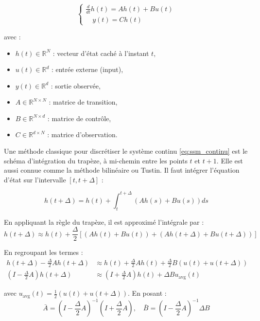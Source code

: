 \begin{equation}
\begin{cases}
\frac{d}{dt} h(t) = A h(t) + B u(t) \\
\quad y(t) = C h(t)
\end{cases}
\label{eq:ssm_continu}
\end{equation}

avec :
\begin{itemize}
    \item $h(t) \in \mathbb{R}^N$ : vecteur d'état caché à l'instant $t$,
    \item $u(t) \in \mathbb{R}^d$ : entrée externe (input),
    \item $y(t) \in \mathbb{R}^d$ : sortie observée,
    \item $A \in \mathbb{R}^{N \times N}$ : matrice de transition,
    \item $B \in \mathbb{R}^{N \times d}$ : matrice de contrôle,
    \item $C \in \mathbb{R}^{d \times N}$ : matrice d'observation.
\end{itemize}

Une méthode classique pour discrétiser le système continu \eqref{eq:ssm_continu} est le schéma d’intégration du trapèze, à mi-chemin entre les points $t$ et $t+1$. Elle est aussi connue comme la méthode bilinéaire ou Tustin. Il faut intégrer l’équation d’état sur l’intervalle $[t, t+\Delta]$ :

\begin{equation}
    h(t+\Delta) = h(t) + \int_t^{t+\Delta} \left( A h(s) + B u(s) \right) ds
\end{equation}

En appliquant la règle du trapèze, il est approximé l'intégrale par :
\begin{equation}
    h(t+\Delta) \approx h(t) + \frac{\Delta}{2} \left[ (A h(t) + B u(t)) + (A h(t+\Delta) + B u(t+\Delta)) \right]
\end{equation}

En regroupant les termes :
\begin{align*}
    h(t+\Delta) - \frac{\Delta}{2} A h(t+\Delta) &\approx h(t) + \frac{\Delta}{2} A h(t) + \frac{\Delta}{2} B \left( u(t) + u(t+\Delta) \right) \\
    \left( I - \frac{\Delta}{2} A \right) h(t+\Delta) &\approx \left( I + \frac{\Delta}{2} A \right) h(t) + \Delta B u_{\text{avg}}(t)
\end{align*}

avec $u_{\text{avg}}(t) = \frac{1}{2}(u(t) + u(t+\Delta))$. En posant :
\begin{equation}
\bar{A} = \left( I - \frac{\Delta}{2} A \right)^{-1} \left( I + \frac{\Delta}{2} A \right), \quad
\bar{B} = \left( I - \frac{\Delta}{2} A \right)^{-1} \Delta B
\end{equation}

